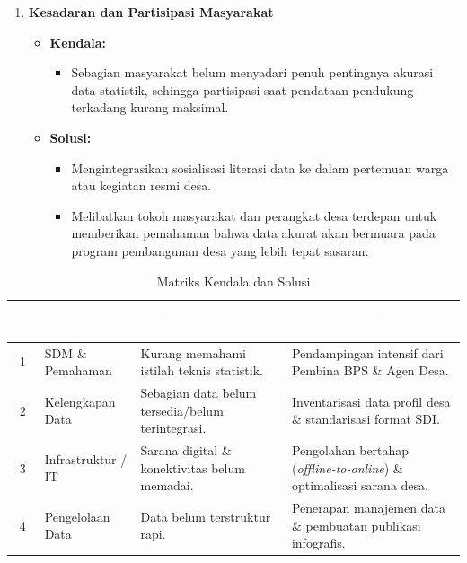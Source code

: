 \begin{enumerate}[label=\textbf{\textcolor{bpsnavy}{\arabic*.}}]
  \item \textbf{Kesadaran dan Partisipasi Masyarakat}
  \begin{itemize}
    \item \textbf{\textcolor{ribbonred}{Kendala:}}
    \begin{itemize}
      \item Sebagian masyarakat belum menyadari penuh pentingnya akurasi data statistik, sehingga partisipasi saat pendataan pendukung terkadang kurang maksimal.
    \end{itemize}
    \item \textbf{\textcolor{bpsgreen}{Solusi:}}
    \begin{itemize}
      \item Mengintegrasikan sosialisasi literasi data ke dalam pertemuan warga atau kegiatan resmi desa.
      \item Melibatkan tokoh masyarakat dan perangkat desa terdepan untuk memberikan pemahaman bahwa data akurat akan bermuara pada program pembangunan desa yang lebih tepat sasaran.
    \end{itemize}
  \end{itemize}
\end{enumerate}

\begin{table}[htbp]
\centering
\small
\caption{Matriks Kendala dan Solusi}
\label{tab:matriks_kendala}
\vspace{0.2cm}
\begin{tabularx}{\textwidth}{|c|Y|Y|Y|}
\hline
{}
\textcolor{white}{\textbf{No}} & \centering\textcolor{white}{\textbf{Bidang Kendala}} & \centering\textcolor{white}{\textbf{Permasalahan Utama}} & \centering\textcolor{white}{\textbf{Solusi / Tindak Lanjut}} \tabularnewline
\hline
{}
1 & SDM \& Pemahaman & Kurang memahami istilah teknis statistik. & Pendampingan intensif dari Pembina BPS \& Agen Desa. \tabularnewline
\hline
{}
2 & Kelengkapan Data & Sebagian data belum tersedia/belum terintegrasi. & Inventarisasi data profil desa \& standarisasi format SDI. \tabularnewline
\hline
{}
3 & Infrastruktur / IT & Sarana digital \& konektivitas belum memadai. & Pengolahan bertahap (\textit{offline-to-online}) \& optimalisasi sarana desa. \tabularnewline
\hline
{}
4 & Pengelolaan Data & Data belum terstruktur rapi. & Penerapan manajemen data \& pembuatan publikasi infografis. \tabularnewline
\hline
\end{tabularx}
\end{table}

